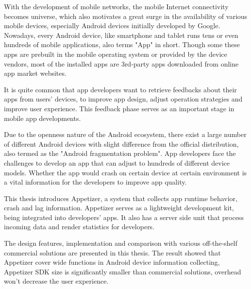 \begin{englishabstract}

With the development of mobile networks, the mobile Internet connectivity becomes universe, which also motivates a great surge in the availability of various mobile devices, especially Android devices initially developed by Google. Nowadays, every Android device, like smartphone and tablet runs tens or even hundreds of mobile applications, also terms "App" in short. Though some these apps are prebuilt in the mobile operating system or provided by the device vendors, most of the installed apps are 3rd-party apps downloaded from online app market websites.

It is quite common that app developers want to retrieve feedbacks about their apps from users' devices, to improve app design, adjust operation strategies and improve user experience. This feedback phase serves as an important stage in mobile app developments.

Due to the openness nature of the Android ecosystem, there exist a large number of different Android devices with slight difference from the official distribution, also termed as the "Android fragmentation problem". App developers face the challenges to develop an app that can adjust to hundreds of different device models. Whether the app would crash on certain device at certain environment is a vital information for the developers to improve app quality.

This thesis introduces Appetizer, a system that collects app runtime behavior, crash and lag information. Appetizer serves as a lightweight development kit, being integrated into developers' apps. It also has a server side unit that process incoming data and render statistics for developers. 

The design features, implementation and comparison with various off-the-shelf commercial solutions are presented in this thesis. The result showed that Appetizer cover wide functions in Android device information collecting, Appetizer SDK size is significantly smaller than commercial solutions, overhead won't decrease the user experience.

\end{englishabstract}
